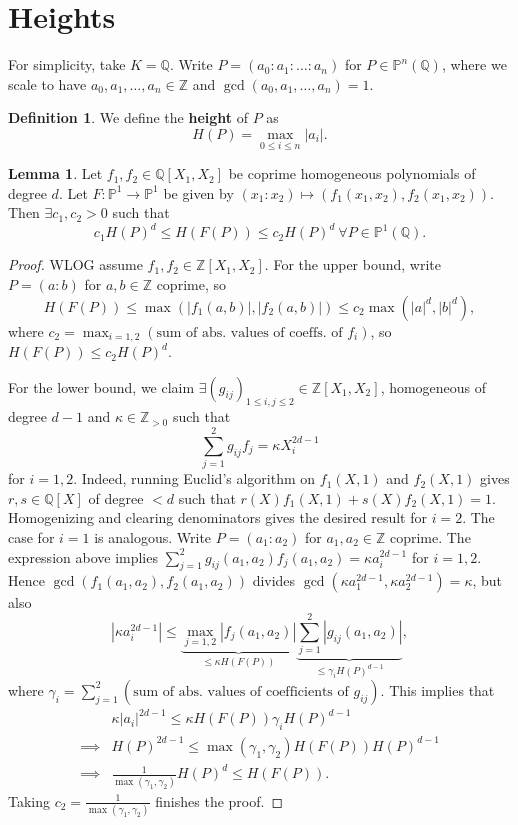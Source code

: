 \documentclass{article}
\theoremstyle{definition}
\newtheorem{lemma}[theorem]{Lemma}
\newtheorem{defn}{Definition}[section]
\begin{document}
\section{Heights}
For simplicity, take $K=\mathbb{Q}$. Write $P = (a_0:a_1:\ldots:a_n)$ for $P \in \mathbb{P}^n(\mathbb{Q})$, where we scale to have $a_0,a_1,\ldots,a_n \in \mathbb{Z}$ and $\gcd(a_0,a_1,\ldots,a_n) = 1$.
\begin{defn}\label{defn13.1}
    We define the \textbf{height} of $P$ as \[
    H(P) = \max_{0\le i\le n} \left|a_i\right|.
    \]
\end{defn}
\begin{lemma}\label{lemma13.1}
    Let $f_1,f_2 \in \mathbb{Q}[X_1,X_2]$ be coprime homogeneous polynomials of degree $d$. Let $F : \mathbb{P}^1 \to \mathbb{P}^1$ be given by $(x_1:x_2) \mapsto (f_1(x_1,x_2),f_2(x_1,x_2))$. Then $\exists c_1,c_2>0$ such that \[
    c_1 H(P)^d \le H(F(P)) \le c_2H(P)^d ~\forall P \in \mathbb{P}^1(\mathbb{Q}).
    \]
\end{lemma}
\begin{proof}
    WLOG assume $f_1,f_2 \in \mathbb{Z}[X_1,X_2]$. For the upper bound, write ${P = (a:b)}$ for $a,b \in \mathbb{Z}$ coprime, so $$H(F(P))\le \max(\left|f_1(a,b)\right|,\left|f_2(a,b)\right|) \le c_2 \max(\left|a\right|^d,\left|b\right|^d),$$
    where $c_2 = \max_{i=1,2}(\text{sum of abs. values of coeffs. of }f_i)$, so $H(F(P))\le c_2 H(P)^d$.

    \vspace{1mm}
     
    For the lower bound, we claim $\exists (g_{ij})_{1\le i,j\le 2} \in \mathbb{Z}[X_1,X_2]$, homogeneous of degree $d-1$ and $\kappa \in \mathbb{Z}_{>0}$ such that \[
    \sum_{j=1}^{2} g_{ij}f_j = \kappa X_i^{2d-1}
    \]
    for $i=1,2$. Indeed, running Euclid's algorithm on $f_1(X,1)$ and $f_2(X,1)$ gives $r,s \in \mathbb{Q}[X]$ of degree $<d$ such that $r(X)f_1(X,1)+s(X)f_2(X,1)=1$. Homogenizing and clearing denominators gives the desired result for $i=2$. The case for $i=1$ is analogous. Write $P = (a_1:a_2)$ for $a_1,a_2 \in \mathbb{Z}$ coprime. The expression above implies $\sum_{j=1}^{2} g_{ij}(a_1,a_2)f_j(a_1,a_2) = \kappa a_i^{2d-1}$ for $i=1,2$. Hence $\gcd(f_1(a_1,a_2),f_2(a_1,a_2))$ divides $\gcd(\kappa a_1^{2d-1}, \kappa a_2^{2d-1}) = \kappa$, but also
    \[
    \left|\kappa a_i^{2d-1}\right|\le \underbrace{\max_{j=1,2} \left|f_j(a_1,a_2)\right|}_{\le \kappa H(F(P))} \underbrace{\sum_{j=1}^{2}\left|g_{ij}(a_1,a_2)\right|}_{\le \gamma_i H(P)^{d-1}},
    \]
    where $\gamma_i = \sum_{j=1}^{2} (\text{sum of abs. values of coefficients of }g_{ij})$. This implies that 
    \begin{align*}
        &\kappa \left|a_i\right|^{2d-1} \le \kappa H(F(P))\gamma_i H(P)^{d-1}\\
        \implies & H(P)^{2d-1} \le \max(\gamma_1,\gamma_2)H(F(P))H(P)^{d-1}\\
        \implies & \frac{1}{\max(\gamma_1,\gamma_2)}H(P)^d \le H(F(P)).
    \end{align*}
    Taking $c_2 = \frac{1}{\max(\gamma_1,\gamma_2)}$ finishes the proof.
\end{proof}
\end{document}
